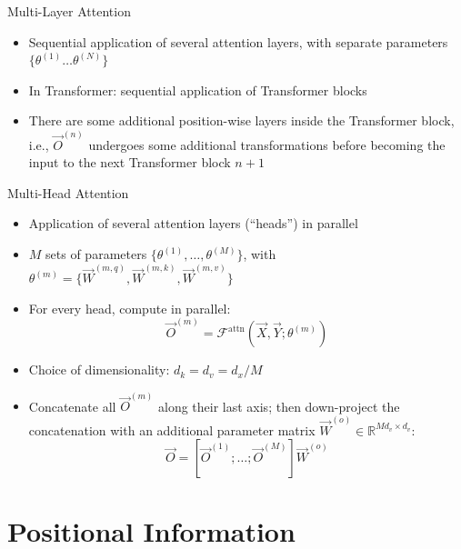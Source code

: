 \documentclass[11pt,compress,t,notes=noshow, xcolor=table]{beamer}
\begin{document}
\begin{frame}{Multi-Layer Attention}

\vfill

\begin{itemize}
\item Sequential application of several attention layers, with separate parameters $\{\theta^{(1)} \ldots \theta^{(N)}\}$ 
\item In Transformer: sequential application of Transformer blocks
\item There are some additional position-wise layers inside the Transformer block, i.e., $\vec O^{(n)}$ undergoes some additional transformations before becoming the input to the next Transformer block $n+1$
\end{itemize}

\vfill

\end{frame}


\begin{frame}{Multi-Head Attention}

\vfill

\begin{itemize}
\item Application of several attention layers (``heads'') in parallel
\item $M$ sets of parameters $\{\theta^{(1)}, \ldots, \theta^{(M)}\}$, with $\theta^{(m)} = \{\vec {W}^{(m,q)}, \vec {W}^{(m,k)}, \vec {W}^{(m,v)}\}$
\item For every head, compute in parallel:
$$ \vec O^{(m)} = \mathcal{F}^\mathrm{attn}(\vec X, \vec Y; \theta^{(m)}) $$
\item Choice of dimensionality: $d_k = d_v = d_{x}/M$ 
\item Concatenate all $\vec {O}^{(m)}$ along their last axis; then down-project the concatenation with an additional parameter matrix $\vec W^{(o)} \in \mathbb{R}^{Md_v \times d_v}$:
$$ \vec O = [\vec O^{(1)}; \ldots;  \vec O^{(M)}] \vec W^{(o)}$$
\end{itemize}

\vfill

\end{frame}


\section{Positional Information}
\end{document}
